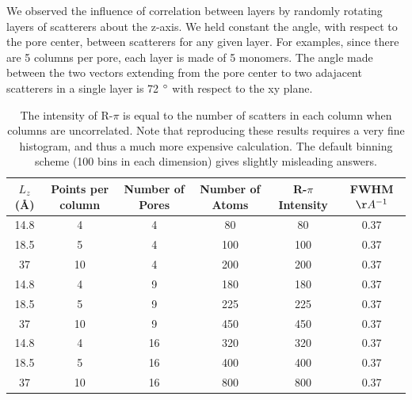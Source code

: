 \documentclass{article}
\begin{document}
  We observed the influence of correlation between layers by randomly rotating layers
  of scatterers about the z-axis. We held constant the angle, with respect to the pore
  center, between scatterers for any given layer. For examples, since there are 5 
  columns per pore, each layer is made of 5 monomers. The angle made between the two 
  vectors extending from the pore center to two adajacent scatterers in a single layer
  is 72 $\degree$ with respect to the xy plane.  

  \begin{table}[!htb]
  \centering
  \begin{tabular}{c c c c c c}
  \toprule
  $L_z$ (\AA) & Points per column & Number of Pores & Number of Atoms & R-$\pi$ Intensity & FWHM $\AA^{-1}$ \\
  \midrule
  14.8        &      4            & 4               & 80              &  80               & 0.37           \\
  18.5        &      5            & 4               & 100             &  100              & 0.37           \\
  37          &      10           & 4               & 200             &  200              & 0.37           \\
  14.8        &      4            & 9               & 180             &  180              & 0.37           \\
  18.5        &      5            & 9               & 225             &  225              & 0.37           \\
  37          &      10           & 9               & 450             &  450              & 0.37           \\
  14.8        &      4            & 16              & 320             &  320              & 0.37           \\
  18.5        &      5            & 16              & 400             &  400              & 0.37           \\
  37          &      10           & 16              & 800             &  800              & 0.37           \\
  \bottomrule
  \end{tabular}
  \caption{The intensity of R-$\pi$ is equal to the number of scatters in
   each column when columns are uncorrelated. Note that reproducing these results requires a very fine histogram, 
   and thus a much more expensive calculation. The default binning scheme (100 bins in each dimension) gives slightly
   misleading answers.}\label{table:randomly_displaced_columns}
  \end{table}
\end{document}
